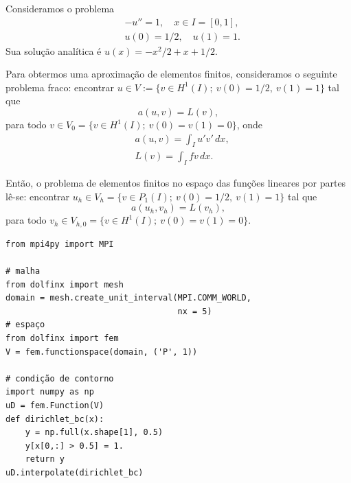 \begin{ex}\label{ex:mef1d_dirichlet}
  Consideramos o problema
  \begin{align}
    &-u'' = 1,\quad x\in I=[0,1],\label{eq:ex_cc_d_eq}\\
    &u(0) = 1/2,\quad u(1) = 1.\label{eq:ex_cc_d_bc}
  \end{align}
Sua solução analítica é $u(x) = -x^2/2+x+1/2$. 

Para obtermos uma aproximação de elementos finitos, consideramos o seguinte problema fraco: encontrar $u\in V := \{v\in H^1(I);~v(0)=1/2,~v(1)=1\}$ tal que
\begin{equation}
  a(u,v) = L(v),
\end{equation}
para todo $v\in V_0 = \{v\in H^1(I);~v(0)=v(1)=0\}$, onde
\begin{align}
  &a(u, v) = \int_I u'v'\,dx,\\
  &L(v) = \int_I fv\,dx.
\end{align}

Então, o problema de elementos finitos no espaço das funções lineares por partes lê-se: encontrar $u_h\in V_h = \{v\in P_1(I);~v(0)=1/2,~v(1)=1\}$ tal que
\begin{equation}
  a(u_h, v_h) = L(v_h),
\end{equation}
para todo $v_h\in V_{h,0} = \{v\in H^1(I);~v(0)=v(1)=0\}$.



\begin{lstlisting}[caption=ex\_mef1d\_dirichlet.py]
from mpi4py import MPI

# malha
from dolfinx import mesh
domain = mesh.create_unit_interval(MPI.COMM_WORLD,
                                   nx = 5)
# espaço
from dolfinx import fem
V = fem.functionspace(domain, ('P', 1))

# condição de contorno
import numpy as np
uD = fem.Function(V)
def dirichlet_bc(x):
    y = np.full(x.shape[1], 0.5)
    y[x[0,:] > 0.5] = 1.
    return y
uD.interpolate(dirichlet_bc)


\end{lstlisting}
\end{ex}

